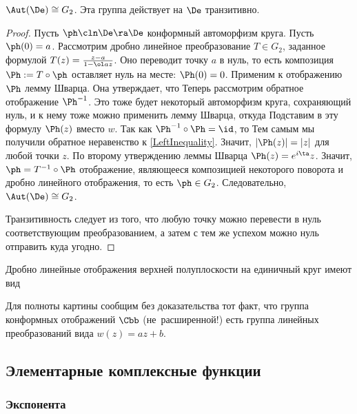 \documentclass[a4paper]{article}
\begin{document}
\begin{theorem}
$\Aut(\De) \cong G_2$. Эта группа действует на $\De$ транзитивно.
\end{theorem}
\begin{proof}
Пусть $\ph\cln\De\ra\De$ конформный автоморфизм круга. Пусть $\ph(0)=a$. Рассмотрим дробно линейное преобразование
$T\in G_2$, заданное формулой $T(z) = \frac{z-a}{1-\ol a z}$. Оно переводит точку $a$ в нуль, то есть
композиция $\Ph := T \circ \ph$ оставляет нуль на месте: $\Ph(0)=0$. Применим к отображению $\Ph$ лемму Шварца.
Она утверждает, что
Теперь рассмотрим обратное отображение $\Ph^{-1}$. Это тоже будет некоторый
автоморфизм круга, сохраняющий нуль, и к нему тоже можно применить лемму Шварца, откуда
Подставим в эту формулу $\Ph(z)$ вместо $w$. Так как $\Ph^{-1} \circ \Ph = \id$, то
Тем самым мы получили обратное неравенство к \eqref{LeftInequality}. Значит, $|\Ph(z)|=|z|$ для любой точки $z$.
По второму утверждению леммы Шварца $\Ph(z)=e^{i\ta}z$. Значит, $\ph = T^{-1}\circ \Ph$ отображение, являющееся
композицией некоторого поворота и дробно линейного отображения, то есть $\ph \in G_2$. Следовательно, $\Aut(\De) \cong G_2$.

Транзитивность следует из того, что любую точку можно перевести в нуль соответствующим преобразованием,
а затем с тем же успехом можно нуль отправить куда угодно.
\end{proof}

Дробно линейные отображения верхней полуплоскости на единичный круг имеют вид

Для полноты картины сообщим без доказательства  тот факт, что группа конформных отображений $\Cbb$ (не~расширенной!)
есть группа линейных преобразований вида $w(z)=az+b$.

\subsection{Элементарные комплексные функции}

\subsubsection{Экспонента}

\begin{df}
\end{df}
\end{document}
